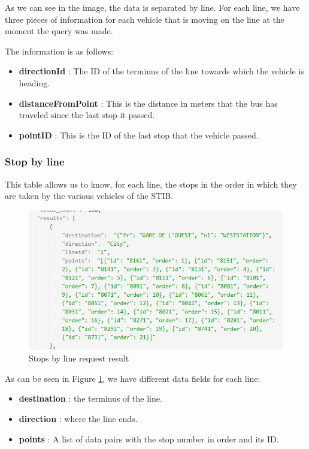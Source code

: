 \documentclass[12pt]{report}
\begin{document}
	As we can see in the image, the data is separated by line. For each line, we have three pieces of information for each vehicle that is moving on the line at the moment the query was made.
	
	The information is as follows:
	
	
	\begin{itemize}[noitemsep]
		\item \textbf{directionId} : The ID of the terminus of the line towards which the vehicle is heading.
		\item \textbf{distanceFromPoint} : This is the distance in meters that the bus has traveled since the last stop it passed.
		\item \textbf{pointID} : This is the ID of the last stop that the vehicle passed.
	\end{itemize}
	
	\subsubsection{Stop by line}
	
	This table allows us to know, for each line, the stops in the order in which they are taken by the various vehicles of the STIB.
	
	\begin{figure}
		\centering
		\includegraphics[width=\textwidth]{images/stops by line}
		\caption{Stops by line request result}
		\label{stops_by_line}
	\end{figure}
	
	As can be seen in Figure \ref{stops_by_line}, we have different data fields for each line: 
	
	\begin{itemize}[noitemsep]
		\item \textbf{destination} : the terminus of the line.
		\item \textbf{direction} : where the line ends.
		\item \textbf{points} : A list of data pairs with the stop number in order and its ID.
	\end{itemize}
	
\end{document}
